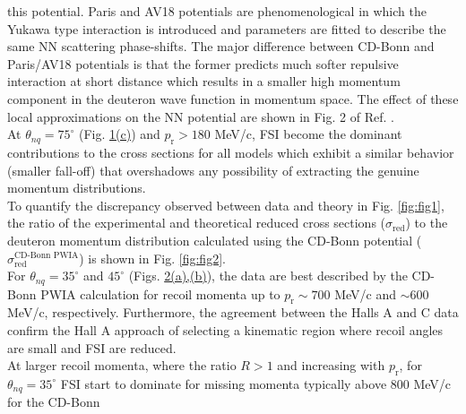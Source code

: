 this potential. Paris and AV18 potentials are phenomenological in which the 
Yukawa type interaction is introduced and parameters are fitted to describe the 
same NN scattering phase-shifts. The major difference between CD-Bonn and Paris/AV18 
potentials is that the former predicts much softer repulsive interaction at short distance which 
results in a smaller high momentum component in the deuteron wave function in momentum space.
The effect of these local approximations on the NN potential are shown in Fig. 2 of Ref. \cite{PhysRevC.63.024001}. \\
\indent At $\theta_{nq}=75^{\circ}$ (Fig. \hyperref[fig:fig1]{1(c)}) and $p_{\mathrm{r}}>180$ MeV/c, FSI become the dominant contributions to the cross sections for all models which exhibit a similar
behavior (smaller fall-off) that overshadows any possibility of extracting the genuine momentum distributions.\\
\indent To quantify the discrepancy observed between data and theory in Fig. \ref{fig:fig1}, the ratio of the experimental and theoretical reduced cross sections ($\sigma_{\mathrm{red}}$) to the
deuteron momentum distribution  calculated using the CD-Bonn potential ($\sigma^{\text{CD-Bonn PWIA}}_{\mathrm{red}}$) \cite{PhysRevC.63.024001} is shown in Fig. \ref{fig:fig2}. \\
\indent For $\theta_{nq}=35^{\circ}$ and $45^{\circ}$ (Figs. \hyperref[fig:fig2]{2(a),(b)}), the data are best described by the CD-Bonn PWIA calculation for recoil momenta up
to $p_{\mathrm{r}}\sim700$ MeV/c and $\sim600$ MeV/c, respectively. Furthermore, the agreement between the Halls A and C data confirm the Hall A approach of selecting a kinematic
region where recoil angles are small and FSI are reduced. \\
\indent At larger recoil momenta, where the ratio $R>1$ and increasing with $p_{\mathrm{r}}$, for $\theta_{nq}=35^{\circ}$ FSI start to dominate for
missing momenta typically above 800 MeV/c for the CD-Bonn
